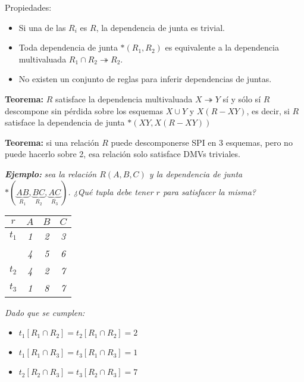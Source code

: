 \documentclass[a4paper, twoside]{article}
\begin{document}
Propiedades:
\begin{itemize}
	\item Si una de las $R_{i}$ es $R$, la dependencia de junta es trivial.
	\item Toda dependencia de junta $*(R_{1},R_{2})$ es equivalente a la dependencia multivaluada $R_{1}\cap R_{2}\twoheadrightarrow R_{2}$.
	\item No existen un conjunto de reglas para inferir dependencias de juntas.
\end{itemize}

\textbf{Teorema:} $R$ satisface la dependencia multivaluada $X\twoheadrightarrow Y$ sí y sólo sí $R$ descompone sin pérdida sobre los esquemas $X\cup Y$ y $X(R-XY)$, es decir, si $R$ satisface la dependencia de junta
$*\left(XY,X(R-XY)\right)$

\textbf{Teorema:} si una relación $R$ puede descomponerse SPI en 3 esquemas, pero no puede hacerlo sobre 2, esa relación solo satisface DMVs triviales.

\textbf{\emph{Ejemplo:}} \emph{sea la relación $R(A,B,C)$ y la dependencia de junta $*\left(\underset{R_{1}}{\underbrace{AB}},\underset{R_{2}}{\underbrace{BC}},\underset{R_{3}}{\underbrace{AC}}\right)$. ¿Qué tupla debe tener $r$ para satisfacer la misma?}

\begin{center}
	\begin{tabular}{|c|c|c|c|}
		\hline 
		$r$ & \emph{$A$} & \emph{$B$} & \emph{$C$}\\
		\hline 
		\hline 
		\emph{$t_{1}$} & \emph{1} & \emph{2} & \emph{3}\\
		\hline 
		 & \emph{4} & \emph{5} & \emph{6}\\
		\hline 
		\emph{$t_{2}$} & \emph{4} & \emph{2} & \emph{7}\\
		\hline 
		\emph{$t_{3}$} & \emph{1} & \emph{8} & \emph{7}\\
		\hline 
	\end{tabular}
\end{center}

\emph{Dado que se cumplen:}
\begin{itemize}
	\item \emph{$t_{1}\left[R_{1}\cap R_{2}\right]=t_{2}\left[R_{1}\cap R_{2}\right]=2$}
	\item \emph{$t_{1}\left[R_{1}\cap R_{3}\right]=t_{3}\left[R_{1}\cap R_{3}\right]=1$}
	\item \emph{$t_{2}\left[R_{2}\cap R_{3}\right]=t_{3}\left[R_{2}\cap R_{3}\right]=7$}
\end{itemize}
\end{document}
